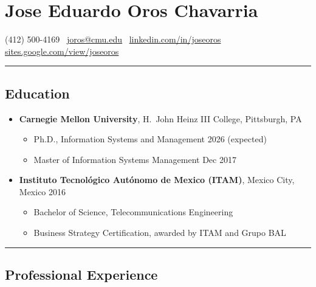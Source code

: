 \documentclass[10pt,letterpaper]{article}
\newcommand{\name}[1]{\section*{#1}}
\newcommand{\sep}{{\color{gray}\,\textbullet\,\,}}
\newcommand{\hsep}{\noindent\textcolor{gray}{\rule{\textwidth}{0.5pt}}}
\newcommand{\block}[1]{\begin{samepage}\hsep\subsection*{#1}\end{samepage}}
\begin{document}
\name{Jose Eduardo Oros Chavarria}

\begin{center}
(412) 500-4169 \sep \href{mailto:joros@cmu.edu}{joros@cmu.edu} \sep \href{https://www.linkedin.com/in/joseoros}{linkedin.com/in/joseoros} \sep \href{https://sites.google.com/view/joseoros}{sites.google.com/view/joseoros}
\end{center}

\block{Education}

\begin{itemize}
\item \textbf{Carnegie Mellon University}, H.\ John Heinz III College, Pittsburgh, PA
  \begin{itemize}[label={}]
  \item Ph.D., Information Systems and Management \hfill 2026 (expected)
  \item Master of Information Systems Management \hfill Dec 2017
  \end{itemize}
\item \textbf{Instituto Tecnol\'ogico Aut\'onomo de Mexico (ITAM)}, Mexico City, Mexico \hfill 2016
  \begin{itemize}[label={}]
  \item Bachelor of Science, Telecommunications Engineering
  \item Business Strategy Certification, awarded by ITAM and Grupo BAL
  \end{itemize}
\end{itemize}

\block{Professional Experience}
\end{document}
